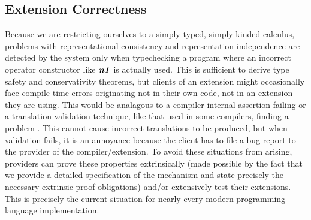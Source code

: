 
\subsection{Extension Correctness}
Because we are restricting ourselves to a simply-typed, simply-kinded calculus, problems with  representational consistency and representation independence are detected by the system only when typechecking a program where an incorrect operator constructor like  $\textbf{\textit{n1}}$ is actually used. This is sufficient to derive type safety and conservativity theorems, but clients of an extension might occasionally face compile-time errors originating not in their own code, not in an extension they are using. This would be analagous to a compiler-internal assertion failing or a translation validation technique, like that used in some compilers, finding a problem \cite{Pnueli-Siegel-Singerman98}. This cannot cause incorrect translations to be produced, but when validation fails, it is an annoyance because the client has to file a bug report to the provider of the compiler/extension.  To avoid these situations from arising, providers can prove these properties extrinsically (made possible by the fact that we provide a detailed specification of the mechanism and state precisely the necessary extrinsic proof obligations) and/or extensively test their extensions. This is precisely the current situation for nearly every modern programming language implementation. 

